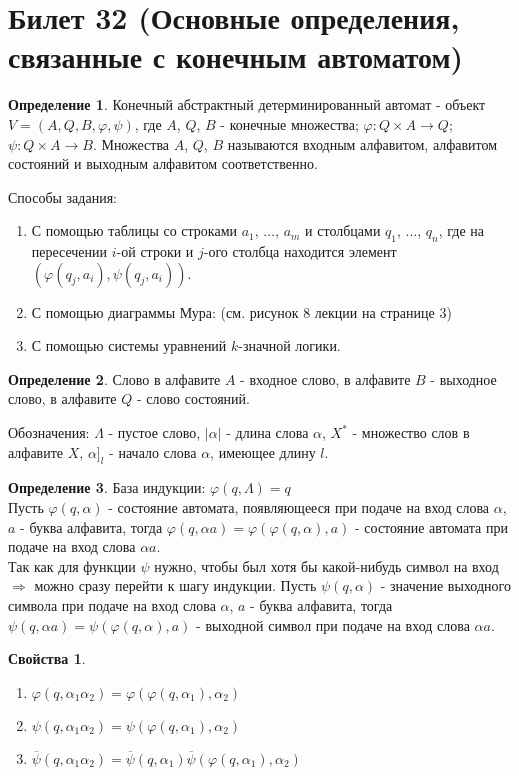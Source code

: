 \documentclass[a4paper, 12pt]{article}
\renewcommand{\phi}{\varphi}
\theoremstyle{definition}
\newtheorem*{definition}{Определение}
\theoremstyle{plain}
\newtheorem*{properties}{Свойства}
\theoremstyle{remark}
\begin{document}
  \section{Билет 32 (Основные определения, связанные с конечным автоматом)}
  \begin{definition}
    Конечный абстрактный детерминированный автомат - объект $V=(A,Q,B,\phi,\psi)$, где $A$, $Q$, $B$ - конечные множества; $\phi:Q\times A\rightarrow Q$; $\psi:Q\times A\rightarrow B$. Множества $A$, $Q$, $B$ называются входным алфавитом, алфавитом состояний и выходным алфавитом соответственно.
  \end{definition}
  Способы задания:\\
  \begin{enumerate}
    \item С помощью таблицы со строками $a_1$, $\ldots$, $a_m$ и столбцами $q_1$, $\ldots$, $q_n$, где на пересечении $i$-ой строки и $j$-ого столбца находится элемент $(\phi(q_j, a_i), \psi(q_j, a_i))$.
    \item С помощью диаграммы Мура: (см. рисунок 8 лекции на странице 3)
    \item С помощью системы уравнений $k$-значной логики.
  \end{enumerate}
  \begin{definition}
    Слово в алфавите $A$ - входное слово, в алфавите $B$ - выходное слово, в алфавите $Q$ - слово состояний.
  \end{definition}
  Обозначения: $\Lambda$ - пустое слово, $|\alpha|$ - длина слова $\alpha$, $X^*$ - множество слов в алфавите $X$, $\alpha]_l$ - начало слова $\alpha$, имеющее длину $l$.
  \begin{definition}
    База индукции: $\phi(q, \Lambda)=q$\\
    Пусть $\phi(q,\alpha)$ - состояние автомата, появляющееся при подаче на вход слова $\alpha$, $a$ - буква алфавита, тогда $\phi(q, \alpha a)=\phi(\phi(q,\alpha),a)$ - состояние автомата при подаче на вход слова $\alpha a$.\\
    Так как для функции $\psi$ нужно, чтобы был хотя бы какой-нибудь символ на вход $\Longrightarrow$ можно сразу перейти к шагу индукции.
    Пусть $\psi(q,\alpha)$ - значение выходного символа при подаче на вход слова $\alpha$, $a$ - буква алфавита, тогда $\psi(q,\alpha a)=\psi(\phi(q,\alpha),a)$ - выходной символ при подаче на вход слова $\alpha a$.
  \end{definition}
  \begin{properties}
    \begin{enumerate}
      \item $\phi(q,\alpha_1\alpha_2)=\phi(\phi(q,\alpha_1),\alpha_2)$
      \item $\psi(q,\alpha_1\alpha_2)=\psi(\phi(q,\alpha_1),\alpha_2)$
      \item $\overline{\psi}(q,\alpha_1\alpha_2)=\overline{\psi}(q,\alpha_1)\overline{\psi}(\phi(q,\alpha_1),\alpha_2)$
    \end{enumerate}
  \end{properties}
\end{document}

